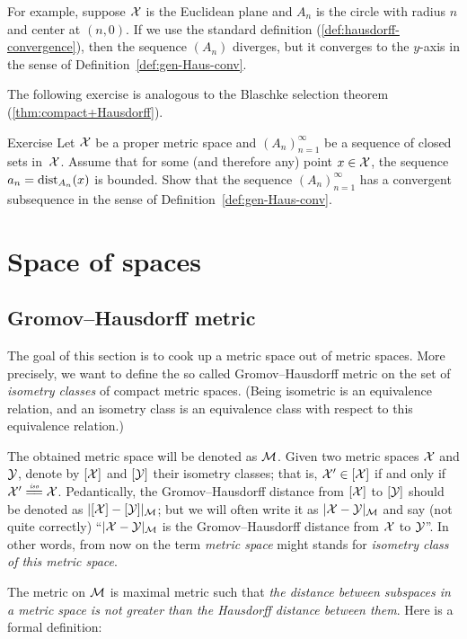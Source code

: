 For example, suppose $\mathcal{X}$ is the Euclidean plane and $A_n$ is the circle with radius $n$ and center at $(n,0)$.
If we use the standard definition (\ref{def:hausdorff-convergence}), then the sequence $(A_n)$ diverges, but it converges to the $y$-axis in the sense of Definition~\ref{def:gen-Haus-conv}.

The following exercise is analogous to the Blaschke selection theorem (\ref{thm:compact+Hausdorff}).

\begin{thm}{Exercise}
Let $\mathcal{X}$ be a proper metric space
and $(A_n)_{n=1}^\infty$ be a sequence of closed sets in~$\mathcal{X}$.
Assume that for some (and therefore any) point  $x\in\mathcal{X}$, 
the sequence $a_n=\mathrm{dist}_{A_n}(x)$ is bounded.
Show that the sequence  $(A_n)_{n=1}^\infty$ has a convergent subsequence in the sense of Definition~\ref{def:gen-Haus-conv}.
\end{thm}

\chapter{Space of spaces}

\section{Gromov--Hausdorff metric}

The goal of this section is to cook up a metric space out of metric spaces.
More precisely, we want to define the so called  Gromov--Hausdorff metric on the set of {}\emph{isometry classes} of compact metric spaces.
(Being isometric is an equivalence relation, 
and an isometry class is an equivalence class with respect to this equivalence relation.)

The obtained metric space will be denoted as $\mathcal{M}$.
Given two metric spaces $\mathcal{X}$ and $\mathcal{Y}$,
denote by $[\mathcal{X}]$ and $[\mathcal{Y}]$ their isometry classes;
that is, $\mathcal{X}'\in [\mathcal{X}]$ if and only if $\spc{X}'\iso \spc{X}$.
Pedantically, the Gromov--Hausdorff distance from $[\mathcal{X}]$ 
to $[\mathcal{Y}]$ should be denoted as $|[\mathcal{X}]-[\mathcal{Y}]|_{\mathcal{M}}$;
but we will often write it as $|\mathcal{X}-\mathcal{Y}|_{\mathcal{M}}$ and say (not quite correctly) 
``$|\mathcal{X}-\mathcal{Y}|_{\mathcal{M}}$ is the Gromov--Hausdorff distance from  $\mathcal{X}$ 
to  $\mathcal{Y}$''.
In other words, from now on the term {}\emph{metric space} might stands for {}\emph{isometry class of this metric space}.

The metric on $\mathcal{M}$ is maximal metric such that {}\emph{the distance between subspaces in a metric space is not greater than the Hausdorff distance between them}.
Here is a formal definition:

